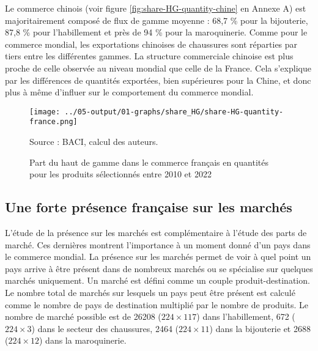 \documentclass[french,10pt,a4paper]{article}
\begin{document}
Le commerce chinois (voir figure \ref{fig:share-HG-quantity-chine} en Annexe A) est majoritairement composé de flux de gamme moyenne : 68,7 \% pour la bijouterie, 87,8 \% pour l'habillement et près de 94 \% pour la maroquinerie. Comme pour le commerce mondial, les exportations chinoises de chaussures sont réparties par tiers entre les différentes gammes. La structure commerciale chinoise est plus proche de celle observée au niveau mondial que celle de la France. Cela s'explique par les différences de quantités exportées, bien supérieures pour la Chine, et donc plus à même d'influer sur le comportement du commerce mondial.

\begin{figure}[!h]
  \centering
  \texttt{[image: ../05-output/01-graphs/share\_HG/share-HG-quantity-france.png]}
  \captionsetup{justification=raggedright,singlelinecheck=false, font=small}
  \caption*{Source : BACI, calcul des auteurs.}
  \captionsetup{justification=centering, singlelinecheck=true, font=normalsize}
  \caption{Part du haut de gamme dans le commerce français en quantités pour les produits sélectionnés entre 2010 et 2022}
  \label{fig:share-HG-quantity-france}
\end{figure}


\subsection{Une forte présence française sur les marchés}
L'étude de la présence sur les marchés est complémentaire à l'étude des parts de marché. Ces dernières montrent l'importance à un moment donné d'un pays dans le commerce mondial. La présence sur les marchés permet de voir à quel point un pays arrive à être présent dans de nombreux marchés ou se spécialise sur quelques marchés uniquement. Un marché est défini comme un couple produit-destination. Le nombre total de marchés sur lesquels un pays peut être présent est calculé comme le nombre de pays de destination multiplié par le nombre de produits. Le nombre de marché possible est de 26208 ($224 \times 117$) dans l'habillement, 672 ($224 \times 3$) dans le secteur des chaussures, 2464 ($224 \times 11$) dans la bijouterie et 2688 ($224 \times 12$) dans la maroquinerie.

\bigskip
\end{document}
